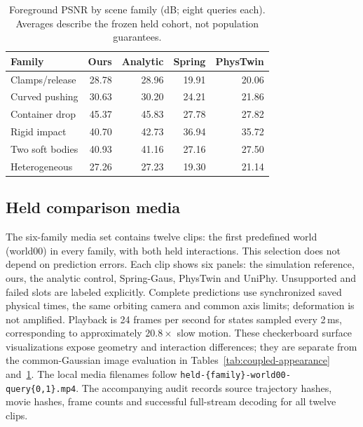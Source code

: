 \begin{table}[t]
\centering\scriptsize
\caption{Foreground PSNR by scene family (dB; eight queries each). Averages describe the frozen held cohort, not population guarantees.}
\label{tab:coupled-appearance-family}
\begin{tabular}{lrrrr}
\toprule Family & Ours & Analytic & Spring & PhysTwin \\
\midrule
Clamps/release & 28.78 & 28.96 & 19.91 & 20.06 \\
Curved pushing & 30.63 & 30.20 & 24.21 & 21.86 \\
Container drop & 45.37 & 45.83 & 27.78 & 27.82 \\
Rigid impact & 40.70 & 42.73 & 36.94 & 35.72 \\
Two soft bodies & 40.93 & 41.16 & 27.16 & 27.50 \\
Heterogeneous & 27.26 & 27.23 & 19.30 & 21.14 \\
\bottomrule
\end{tabular}
\end{table}

\subsection{Held comparison media}
The six-family media set contains twelve clips: the first predefined world
(world00) in every family, with both held interactions. This selection does
not depend on prediction errors. Each clip shows six panels: the simulation
reference, ours, the analytic control, Spring-Gaus, PhysTwin and UniPhy.
Unsupported and failed slots are labeled explicitly. Complete predictions
use synchronized saved physical times, the same orbiting camera and common
axis limits; deformation is not amplified. Playback is 24 frames per second
for states sampled every 2\,ms, corresponding to approximately $20.8\times$
slow motion. These checkerboard surface visualizations expose geometry and
interaction differences; they are separate from the common-Gaussian image
evaluation in Tables~\ref{tab:coupled-appearance}
and~\ref{tab:coupled-appearance-family}.
The local media filenames follow
\texttt{held-\{family\}-world00-query\{0,1\}.mp4}.
The accompanying audit records source trajectory hashes, movie hashes,
frame counts and successful full-stream decoding for all twelve clips.
